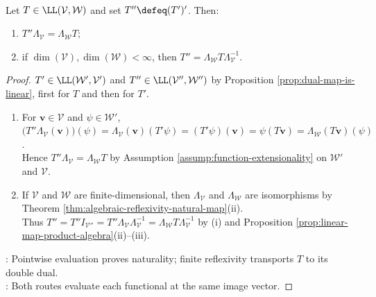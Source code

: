 \begin{corollary} \label{cor:double-dual-map-identifies-with-original-map} \\
Let $T\in\LL(\mathcal{V},\mathcal{W})$ and set $T''\defeq(T')'$. Then:
\begin{enumerate}[label=(\roman*)]
\setlength{\itemsep}{0pt}
\item $T''\Lambda_{\mathcal{V}}=\Lambda_{\mathcal{W}}T$;
\item if $\dim(\mathcal{V}),\dim(\mathcal{W})<\infty$, then $T''=\Lambda_{\mathcal{W}}T\Lambda_{\mathcal{V}}^{-1}$.
\end{enumerate}
\begin{proof}
$T'\in\LL(\mathcal{W}',\mathcal{V}')$ and $T''\in\LL(\mathcal{V}'',\mathcal{W}'')$ by Proposition \ref{prop:dual-map-is-linear}, first for $T$ and then for $T'$.
\begin{enumerate}[label=(\roman*)]
\setlength{\itemsep}{0pt}
\item For $\mathbf{v}\in\mathcal{V}$ and $\psi\in\mathcal{W}'$, $\bigl(T''\Lambda_{\mathcal{V}}(\mathbf{v})\bigr)(\psi)=\Lambda_{\mathcal{V}}(\mathbf{v})(T'\psi)=(T'\psi)(\mathbf{v})=\psi(T\mathbf{v})=\Lambda_{\mathcal{W}}(T\mathbf{v})(\psi)$.\\
Hence $T''\Lambda_{\mathcal{V}}=\Lambda_{\mathcal{W}}T$ by Assumption \ref{assump:function-extensionality} on $\mathcal{W}'$ and $\mathcal{V}$.
\item If $\mathcal{V}$ and $\mathcal{W}$ are finite-dimensional, then $\Lambda_{\mathcal{V}}$ and $\Lambda_{\mathcal{W}}$ are isomorphisms by Theorem \ref{thm:algebraic-reflexivity-natural-map}(ii).\\
Thus $T''=T''I_{\mathcal{V}''}=T''\Lambda_{\mathcal{V}}\Lambda_{\mathcal{V}}^{-1}=\Lambda_{\mathcal{W}}T\Lambda_{\mathcal{V}}^{-1}$ by (i) and Proposition \ref{prop:linear-map-product-algebra}(ii)--(iii).
\end{enumerate}
: Pointwise evaluation proves naturality; finite reflexivity transports $T$ to its double dual.\\
: Both routes evaluate each functional at the same image vector.
\end{proof}
\end{corollary}
